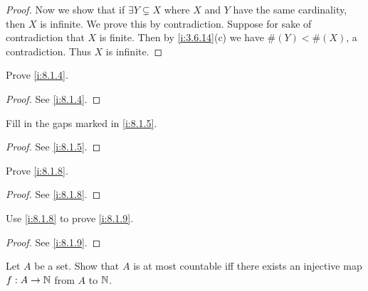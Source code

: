 \begin{proof}
  Now we show that if \(\exists Y \subsetneq X\) where \(X\) and \(Y\) have the same cardinality, then \(X\) is infinite.
  We prove this by contradiction.
  Suppose for sake of contradiction that \(X\) is finite.
  Then by \cref{i:3.6.14}(c) we have \(\#(Y) < \#(X)\), a contradiction.
  Thus \(X\) is infinite.
\end{proof}

\begin{ex}\label{i:ex:8.1.2}
  Prove \cref{i:8.1.4}.
\end{ex}

\begin{proof}
  See \cref{i:8.1.4}.
\end{proof}

\begin{ex}\label{i:ex:8.1.3}
  Fill in the gaps marked in \cref{i:8.1.5}.
\end{ex}

\begin{proof}
  See \cref{i:8.1.5}.
\end{proof}

\begin{ex}\label{i:ex:8.1.4}
  Prove \cref{i:8.1.8}.
\end{ex}

\begin{proof}
  See \cref{i:8.1.8}.
\end{proof}

\begin{ex}\label{i:ex:8.1.5}
  Use \cref{i:8.1.8} to prove \cref{i:8.1.9}.
\end{ex}

\begin{proof}
  See \cref{i:8.1.9}.
\end{proof}

\begin{ex}\label{i:ex:8.1.6}
  Let \(A\) be a set.
  Show that \(A\) is at most countable iff there exists an injective map \(f : A \to \mathbb{N}\) from \(A\) to \(\mathbb{N}\).
\end{ex}

